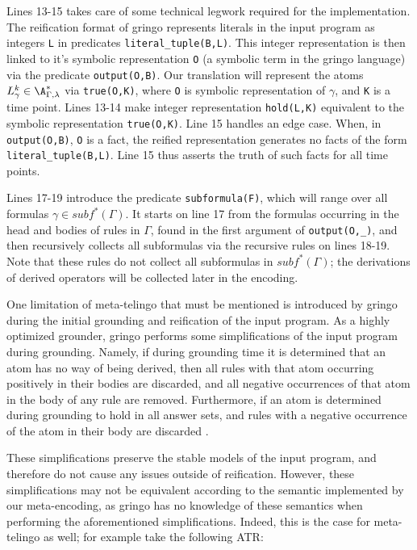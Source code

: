Lines 13-15 takes care of some technical legwork required for the
implementation. The reification format of gringo represents literals
in the input program as integers \verb|L| in predicates
\verb|literal_tuple(B,L)|. This integer representation is then linked
to it's symbolic representation \verb|O| (a symbolic term in the
gringo language) via the predicate \verb|output(O,B)|. Our translation
will represent the atoms $L_\gamma^k \in \A_{\Gamma,\lambda}^*$ via
\verb|true(O,K)|, where \verb|O| is symbolic representation of
$\gamma$, and \verb|K| is a time point. Lines 13-14 make integer
representation \verb|hold(L,K)| equivalent to the symbolic
representation \verb|true(O,K)|. Line 15 handles an edge case. When,
in \verb|output(O,B)|, \verb|O| is a fact, the reified representation
generates no facts of the form \verb|literal_tuple(B,L)|. Line 15 thus
asserts the truth of such facts for all time points.

Lines 17-19 introduce the predicate \verb|subformula(F)|, which will
range over all formulas $\gamma \in subf^*(\Gamma)$. It starts on line
17 from the formulas occurring in the head and bodies of rules in
$\Gamma$, found in the first argument of \verb|output(O,_)|, and then
recursively collects all subformulas via the recursive rules on lines
18-19. Note that these rules do not collect all subformulas in
$subf^*(\Gamma)$; the derivations of derived operators will be
collected later in the encoding.




One limitation of meta-telingo that must be mentioned is introduced by
gringo during the initial grounding and reification of the input
program. As a highly optimized grounder, gringo performs some
simplifications of the input program during grounding. Namely, if
during grounding time it is determined that an atom has no way of
being derived, then all rules with that atom occurring positively in
their bodies are discarded, and all negative occurrences of that atom
in the body of any rule are removed. Furthermore, if an atom is
determined during grounding to hold in all answer sets, and rules with
a negative occurrence of the atom in their body are discarded \cite{gekakasc12a}.

These simplifications preserve the stable models of the input program,
and therefore do not cause any issues outside of reification. However,
these simplifications may not be equivalent according to the semantic
implemented by our meta-encoding, as gringo has no knowledge of these
semantics when performing the aforementioned simplifications. Indeed,
this is the case for meta-telingo as well; for example take the
following ATR:

